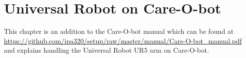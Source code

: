 \chapter{Universal Robot on Care-O-bot}
This chapter is an addition to the Care-O-bot manual which can be found at \url{https://github.com/ipa320/setup/raw/master/manual/Care-O-bot_manual.pdf} and explains handling the Universal Robot UR5 arm on Care-O-bot.





